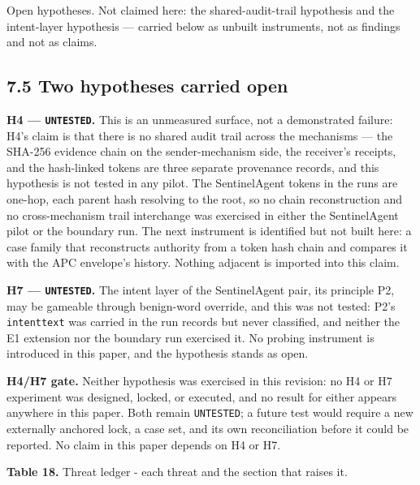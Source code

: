 \documentclass[
  10pt,
]{article}
\let\origtexttt\texttt
\renewcommand{\texttt}[1]{{\upshape\origtexttt{#1}}}
\renewcommand{\_}{\allowbreak\origunderscore}
\begin{document}
Open hypotheses. Not claimed here: the shared-audit-trail hypothesis and
the intent-layer hypothesis --- carried below as unbuilt instruments,
not as findings and not as claims.

\subsection{7.5 Two hypotheses carried
open}\label{two-hypotheses-carried-open}

\textbf{H4 --- \texttt{UNTESTED}.} This is an unmeasured surface, not a
demonstrated failure: H4's claim is that there is no shared audit trail
across the mechanisms --- the SHA-256 evidence chain on the
sender-mechanism side, the receiver's receipts, and the hash-linked
tokens are three separate provenance records, and this hypothesis is not
tested in any pilot. The SentinelAgent tokens in the runs are one-hop,
each parent hash resolving to the root, so no chain reconstruction and
no cross-mechanism trail interchange was exercised in either the
SentinelAgent pilot or the boundary run. The next instrument is
identified but not built here: a case family that reconstructs authority
from a token hash chain and compares it with the APC envelope's history.
Nothing adjacent is imported into this claim.

\textbf{H7 --- \texttt{UNTESTED}.} The intent layer of the SentinelAgent
pair, its principle P2, may be gameable through benign-word override,
and this was not tested: P2's \texttt{intent\_text} was carried in the
run records but never classified, and neither the E1 extension nor the
boundary run exercised it. No probing instrument is introduced in this
paper, and the hypothesis stands as open.

\textbf{H4/H7 gate.} Neither hypothesis was exercised in this revision:
no H4 or H7 experiment was designed, locked, or executed, and no result
for either appears anywhere in this paper. Both remain
\texttt{UNTESTED}; a future test would require a new externally anchored
lock, a case set, and its own reconciliation before it could be
reported. No claim in this paper depends on H4 or H7.

\textbf{Table 18.} Threat ledger - each threat and the section that
raises it.
\end{document}
